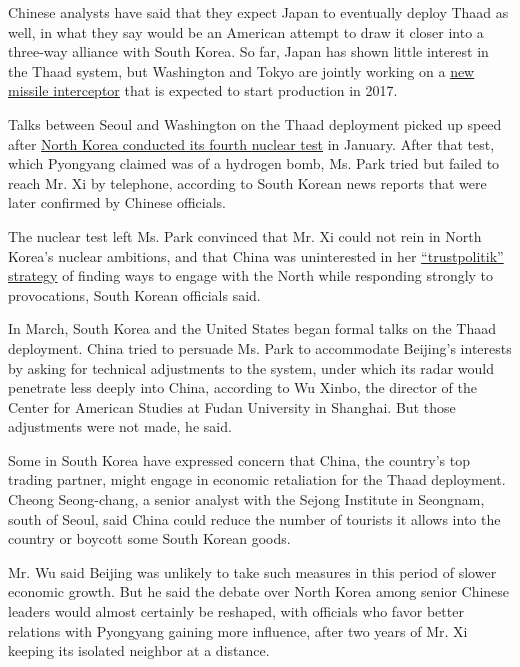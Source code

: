 Chinese analysts have said that they expect Japan to eventually deploy
Thaad as well, in what they say would be an American attempt to draw it
closer into a three-way alliance with South Korea. So far, Japan has
shown little interest in the Thaad system, but Washington and Tokyo are
jointly working on a
\href{http://spacenews.com/new-sm-3-variant-faces-two-intercept-tests-this-year/}{new
missile interceptor} that is expected to start production in 2017.

Talks between Seoul and Washington on the Thaad deployment picked up
speed after
\href{http://www.nytimes.com/2016/01/07/world/asia/north-korea-hydrogen-bomb-q-a.html}{North
Korea conducted its fourth nuclear test} in January. After that test,
which Pyongyang claimed was of a hydrogen bomb, Ms. Park tried but
failed to reach Mr. Xi by telephone, according to South Korean news
reports that were later confirmed by Chinese officials.

The nuclear test left Ms. Park convinced that Mr. Xi could not rein in
North Korea's nuclear ambitions, and that China was uninterested in her
\href{http://www.nytimes.com/2013/05/08/world/asia/obama-backs-policy-of-south-koreas-president-on-north.html}{``trustpolitik''
strategy} of finding ways to engage with the North while responding
strongly to provocations, South Korean officials said.

In March, South Korea and the United States began formal talks on the
Thaad deployment. China tried to persuade Ms. Park to accommodate
Beijing's interests by asking for technical adjustments to the system,
under which its radar would penetrate less deeply into China, according
to Wu Xinbo, the director of the Center for American Studies at Fudan
University in Shanghai. But those adjustments were not made, he said.

Some in South Korea have expressed concern that China, the country's top
trading partner, might engage in economic retaliation for the Thaad
deployment. Cheong Seong-chang, a senior analyst with the Sejong
Institute in Seongnam, south of Seoul, said China could reduce the
number of tourists it allows into the country or boycott some South
Korean goods.

Mr. Wu said Beijing was unlikely to take such measures in this period of
slower economic growth. But he said the debate over North Korea among
senior Chinese leaders would almost certainly be reshaped, with
officials who favor better relations with Pyongyang gaining more
influence, after two years of Mr. Xi keeping its isolated neighbor at a
distance.

